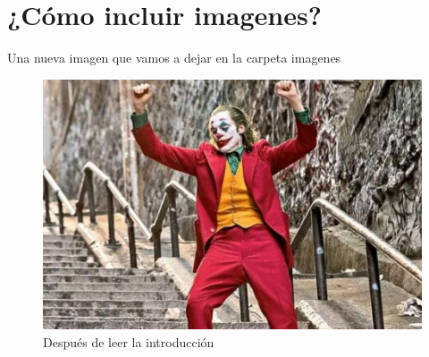 \documentclass[conference, onecolumn]{IEEEtran}
\begin{document}
\section{¿Cómo incluir imagenes?}
%
Una nueva imagen que vamos a dejar en la carpeta imagenes
%
\begin{figure}[htbp]
    \centerline{\includegraphics[scale=0.3]{imagenes/joker.jpg}}
    \caption{Después de leer la introducción}
    \label{fig:feed_inicial}
\end{figure}
%
\end{document}
